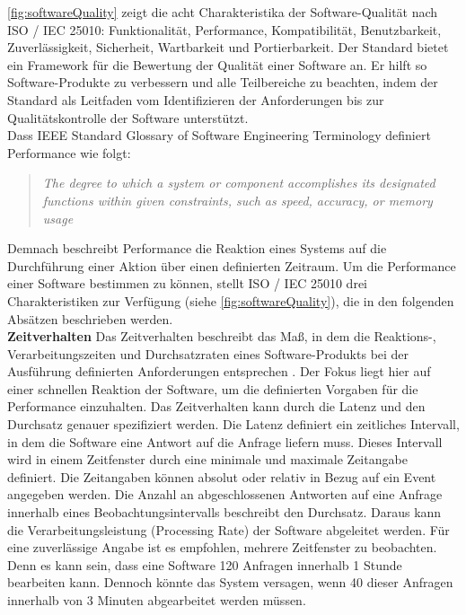 \noindent
\autoref{fig:softwareQuality} zeigt die acht Charakteristika der Software-Qualität nach ISO / IEC 25010: Funktionalität, Performance, Kompatibilität, Benutzbarkeit, Zuverlässigkeit, Sicherheit, Wartbarkeit und Portierbarkeit. Der Standard bietet ein Framework für die Bewertung der Qualität einer Software an. Er hilft so Software-Produkte zu verbessern und alle Teilbereiche zu beachten, indem der Standard als Leitfaden vom Identifizieren der Anforderungen bis zur Qualitätskontrolle der Software unterstützt.\cite{ISOIEC.}\\

\noindent
Dass IEEE Standard Glossary of Software Engineering Terminology definiert Performance wie folgt:
\begin{quote}
	\emph{\grqq{}The degree to which a system or component accomplishes its designated functions within given constraints, such as speed, accuracy, or memory usage\grqq{}} \cite{IEEE.}
\end{quote}

\noindent
Demnach beschreibt Performance die Reaktion eines Systems auf die Durchführung einer Aktion über einen definierten Zeitraum. Um die Performance einer Software bestimmen zu können, stellt ISO / IEC 25010 drei Charakteristiken zur Verfügung (siehe \autoref{fig:softwareQuality}), die in den folgenden Absätzen beschrieben werden.\\

\noindent
\textbf{Zeitverhalten}\newline
Das Zeitverhalten beschreibt das Maß, in dem die Reaktions-, Verarbeitungszeiten und Durchsatzraten eines Software-Produkts bei der Ausführung definierten Anforderungen entsprechen \cite{ISOIEC.}. Der Fokus liegt hier auf einer schnellen Reaktion der Software, um die definierten Vorgaben für die Performance einzuhalten. Das Zeitverhalten kann durch die Latenz und den Durchsatz genauer spezifiziert werden. Die Latenz definiert ein zeitliches Intervall, in dem die Software eine Antwort auf die Anfrage liefern muss. Dieses Intervall wird in einem Zeitfenster durch eine minimale und maximale Zeitangabe definiert. Die Zeitangaben können absolut oder relativ in Bezug auf ein Event angegeben werden. Die Anzahl an abgeschlossenen Antworten auf eine Anfrage innerhalb eines Beobachtungsintervalls beschreibt den Durchsatz. Daraus kann die Verarbeitungsleistung (Processing Rate) der Software abgeleitet werden. Für eine zuverlässige Angabe ist es empfohlen, mehrere Zeitfenster zu beobachten. Denn es kann sein, dass eine Software 120 Anfragen innerhalb 1 Stunde bearbeiten kann. Dennoch könnte das System versagen, wenn 40 dieser Anfragen innerhalb von 3 Minuten abgearbeitet werden müssen.\cite{Barbacci.1995}\\

